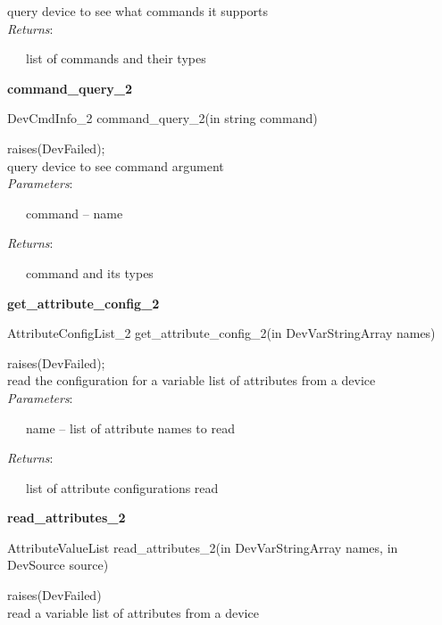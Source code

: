 query device to see what commands it supports\\


\emph{Returns}:

~~~list of commands and their types\\


\begin{flushleft}
\textbf{command\_query\_2}
\par\end{flushleft}

DevCmdInfo\_2 command\_query\_2(in string command)

raises(DevFailed);\\


query device to see command argument\\


\emph{Parameters}:

~~~command -- name

\emph{Returns}:

~~~command and its types\\


\begin{flushleft}
\textbf{get\_attribute\_config\_2}
\par\end{flushleft}

AttributeConfigList\_2 get\_attribute\_config\_2(in DevVarStringArray
names)

raises(DevFailed);\\


read the configuration for a variable list of attributes from a device\\


\emph{Parameters}:

~~~name -- list of attribute names to read

\emph{Returns}:

~~~list of attribute configurations read\\


\begin{flushleft}
\textbf{read\_attributes\_2}
\par\end{flushleft}

AttributeValueList read\_attributes\_2(in DevVarStringArray names,
in DevSource source)

raises(DevFailed)\\


read a variable list of attributes from a device\\



